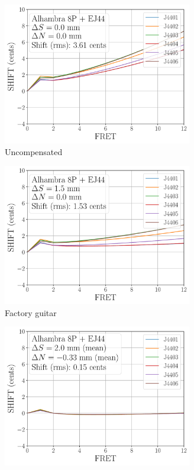  \begin{figure}
  \centering
  \begin{subfigure}[b]{0.45\textwidth}
   \centering
   \includegraphics[width=3.25in]{../figures/shift_alhambra8p_ej44_null}
   \caption{Uncompensated}
   \label{fig:shift_alhambra8p_ej44_null}
  \end{subfigure}
  \hspace{0.25in}
  \begin{subfigure}[b]{0.45\textwidth}
   \centering
   \includegraphics[width=3.25in]{../figures/shift_alhambra8p_ej44_factory}
   \caption{Factory guitar}
   \label{fig:shift_alhambra8p_ej44_factory}
  \end{subfigure}
  \par\vspace{0.25in}
  \begin{subfigure}[b]{0.45\textwidth}
   \centering
   \includegraphics[width=3.25in]{../figures/shift_alhambra8p_ej44_full}

\end{subfigure}
\end{figure}
